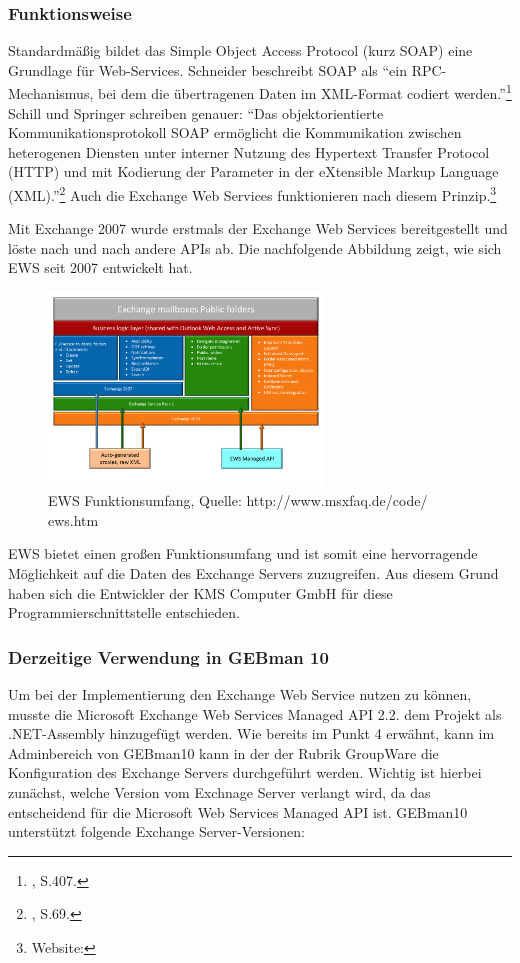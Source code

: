 \subsubsection{Funktionsweise}
\noindent
Standardmäßig bildet das Simple Object Access Protocol (kurz SOAP) eine Grundlage für Web-Services. Schneider beschreibt SOAP als \enquote{ein RPC-Mechanismus, bei dem die übertragenen Daten im XML-Format codiert werden.}\footnote{\citeauthor{Schneider} \citeyear{Schneider}, S.407.}
Schill und Springer schreiben genauer: \enquote{Das objektorientierte Kommunikationsprotokoll SOAP ermöglicht die Kommunikation zwischen heterogenen Diensten unter interner Nutzung
des Hypertext Transfer Protocol (HTTP) und mit Kodierung der Parameter in der eXtensible Markup Language (XML).}\footnote{\citeauthor{Schill} \citeyear{Schill}, S.69.}
Auch die Exchange Web Services funktionieren nach diesem Prinzip.\footnote{Website:\cite{MicrosoftSDK}}
 
\noindent
Mit Exchange 2007 wurde erstmals der Exchange Web Services  bereitgestellt und löste nach und nach andere APIs ab. Die nachfolgende Abbildung zeigt, wie sich EWS seit 2007 entwickelt hat.

\begin{figure}[h!]
\centering
\includegraphics[width=0.65\textwidth]{Abbildungen/EWS_Funktionsumfang.pdf}
	\caption[EWS Funktionsumfang]{EWS Funktionsumfang, Quelle: http://www.msxfaq.de/code/
	ews.htm}
	\label{fig:EWS_Funktionsumfang}
\end{figure}

\noindent
EWS bietet einen großen Funktionsumfang und ist somit eine hervorragende Möglichkeit auf die Daten des Exchange Servers zuzugreifen. Aus diesem Grund haben sich die Entwickler der KMS Computer GmbH für diese Programmierschnittstelle entschieden.

\subsubsection{Derzeitige Verwendung in GEBman 10}
\noindent
Um bei der Implementierung den Exchange Web Service nutzen zu können, musste die Microsoft Exchange Web Services Managed API 2.2. dem Projekt als .NET-Assembly hinzugefügt werden. Wie bereits im Punkt 4 erwähnt, kann im Adminbereich von GEBman10 kann in der der Rubrik GroupWare die Konfiguration des Exchange Servers durchgeführt werden. Wichtig ist hierbei zunächst, welche Version vom Exchnage Server verlangt wird, da das entscheidend für die Microsoft Web Services Managed API ist. GEBman10 unterstützt folgende Exchange Server-Versionen:

